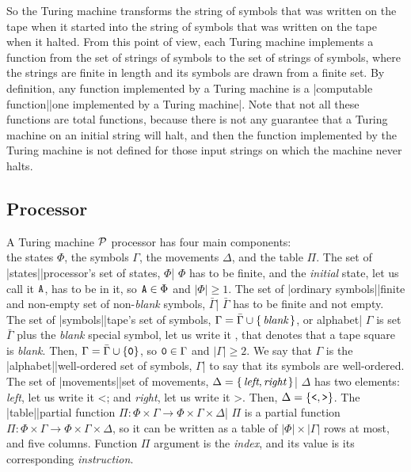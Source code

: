 \dest
So the Turing machine transforms the string of symbols that was
written on the tape when it started into the string of symbols
that was written on the tape when it halted.
From this point of view, each Turing machine
implements a function from the set of strings of symbols
to the set of strings of symbols,
where the strings are finite in length and
its symbols are drawn from a finite set.
By definition, any function implemented by a Turing machine is
a |computable function||one implemented by a Turing machine|.
Note that not all these functions are total functions,
because there is not any guarantee that
a Turing machine on an initial string will halt,
and then the function implemented by the Turing machine
is not defined for those input strings on which the
machine never halts.


\subsection{Processor}

\dest
A Turing machine $\cal P$ processor has four main components:\\
the states $\Phi$, the symbols $\Gamma$,
the movements $\Delta$, and the table $\Pi$.
\beginpoints
\point The set of |states||processor’s set of states, $\Phi$|
 $\Phi$ has to be finite, and
 the {\em initial} state, let us call it $\hbox{\tt A}$, has to be in it,
 so $\hbox{\tt A} \in\Phi$ and $|\Phi| \ge 1$.
\point The set of |ordinary symbols||finite and non-empty set
 of non-{\em blank} symbols, $\bar\Gamma$|
 $\bar\Gamma$ has to be finite and not empty. The set of
 |symbols||tape’s set of symbols,
 $\Gamma = \bar\Gamma \cup \{\,\hbox{\it blank}\,\}$, or alphabet|
 $\Gamma$ is set $\bar\Gamma$ plus the {\em blank} special symbol,
 let us write it , that denotes that a tape square is {\em blank}.
 Then, $\Gamma = \bar\Gamma \cup \{ \hbox{\tt0} \}$,
 so $\hbox{\tt0}\in\Gamma$ and $|\Gamma| \ge 2$.
 We say that $\Gamma$ is the
 |alphabet||well-ordered set of symbols, $\Gamma$|
 to say that its symbols are well-ordered.
\point The set of |movements||set of movements,
 $ \Delta=\{\, \hbox{\it left}, \hbox{\it right}\, \}$|
 $\Delta$ has two elements:
 {\em left}, let us write it \M<; and
 {\em right}, let us write it \M>.
 Then, $\Delta=\{\hbox{\tt<}, \hbox{\tt>}\}$.
\point The |table||partial function
 $\Pi: \Phi\times\Gamma \to \Phi\times\Gamma\times\Delta$|
 $\Pi$ is a partial function
 $\Pi: \Phi\times\Gamma \to \Phi\times\Gamma\times\Delta$,
 so it can be written as a table
 of $|\Phi|\times|\Gamma|$ rows at most, and five columns.
 Function $\Pi$ argument is the {\em index}, and
 its value is its corresponding {\em instruction}.
\endpoints

